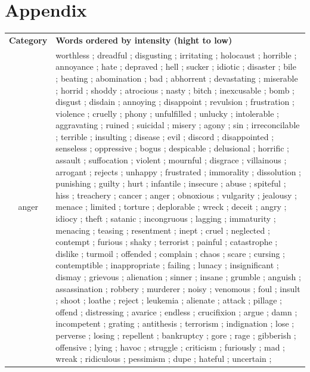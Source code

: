 \documentclass[11pt]{article}
\begin{document}
\section*{Appendix}
\begin{table}[th]%
\begin{center}
\scriptsize
\begin{tabular}{c @{\hspace{0pt}}  @{\hspace{15pt}}p{}}
\toprule[.12em]\addlinespace
{\bf\small Category} & {\bf\small Words ordered by intensity (hight to low) } \\ \addlinespace
\midrule \addlinespace
anger & 
worthless	;
dreadful	;
disgusting	;
irritating	;
holocaust	;
horrible	;
annoyance	;
hate	;
depraved	;
hell	;
sucker	;
idiotic	;
disaster	;
bile	;
beating	;
abomination	;
bad	;
abhorrent	;
devastating	;
miserable	;
horrid	;
shoddy	;
atrocious	;
nasty	;
bitch	;
inexcusable	;
bomb	;
disgust	;
disdain	;
annoying	;
disappoint	;
revulsion	;
frustration	;
violence	;
cruelly	;
phony	;
unfulfilled	;
unlucky	;
intolerable	;
aggravating	;
ruined	;
suicidal	;
misery	;
agony	;
sin	;
irreconcilable	;
terrible	;
insulting	;
disease	;
evil	;
discord	;
disappointed	;
senseless	;
oppressive	;
bogus	;
despicable	;
delusional	;
horrific	;
assault	;
suffocation	;
violent	;
mournful	;
disgrace	;
villainous	;
arrogant	;
rejects	;
unhappy	;
frustrated	;
immorality	;
dissolution	;
punishing	;
guilty	;
hurt	;
infantile	;
insecure	;
abuse	;
spiteful	;
hiss	;
treachery	;
cancer	;
anger	;
obnoxious	;
vulgarity	;
jealousy	;
menace	;
limited	;
torture	;
deplorable	;
wreck	;
deceit	;
angry	;
idiocy	;
theft	;
satanic	;
incongruous	;
lagging	;
immaturity	;
menacing	;
teasing	;
resentment	;
inept	;
cruel	;
neglected	;
contempt	;
furious	;
shaky	;
terrorist	;
painful	;
catastrophe	;
dislike	;
turmoil	;
offended	;
complain	;
chaos	;
scare	;
cursing	;
contemptible	;
inappropriate	;
failing	;
lunacy	;
insignificant	;
dismay	;
grievous	;
alienation	;
sinner	;
insane	;
grumble	;
anguish	;
assassination	;
robbery	;
murderer	;
noisy	;
venomous	;
foul	;
insult	;
shoot	;
loathe	;
reject	;
leukemia	;
alienate	;
attack	;
pillage	;
offend	;
distressing	;
avarice	;
endless	;
crucifixion	;
argue	;
damn	;
incompetent	;
grating	;
antithesis	;
terrorism	;
indignation	;
lose	;
perverse	;
losing	;
repellent	;
bankruptcy	;
gore	;
rage	;
gibberish	;
offensive	;
lying	;
havoc	;
struggle	;
criticism	;
furiously	;
mad	;
wreak	;
ridiculous	;
pessimism	;
dupe	;
hateful	;
uncertain	;

\end{tabular}
\end{center}
\end{table}
\end{document}
